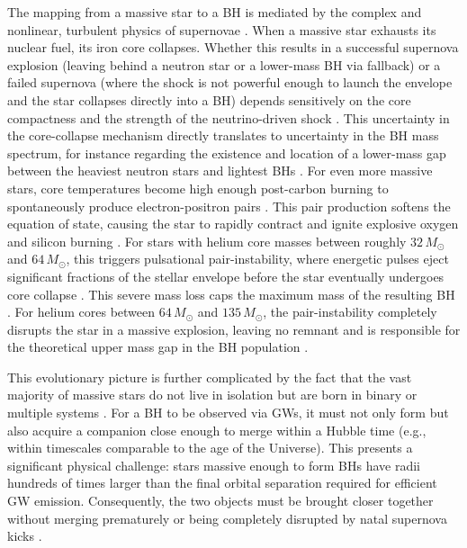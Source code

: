 \begin{refsection}
The mapping from a massive star to a \ac{BH} is mediated by the complex and nonlinear, turbulent physics of supernovae \citep{heger_how_2003}. When a massive star exhausts its nuclear fuel, its iron core collapses. Whether this results in a successful supernova explosion (leaving behind a neutron star or a lower-mass \ac{BH} via fallback) or a failed supernova (where the shock is not powerful enough to launch the envelope and the star collapses directly into a \ac{BH}) depends sensitively on the core compactness and the strength of the neutrino-driven shock \citep[e.g.,][]{sukhbold_core-collapse_2016, burrows_overarching_2020}. This uncertainty in the core-collapse mechanism directly translates to uncertainty in the \ac{BH} mass spectrum, for instance regarding the existence and location of a lower-mass gap between the heaviest neutron stars and lightest \acp{BH} \citep{fryer_compact_2012, abac_observation_2024}. For even more massive stars, core temperatures become high enough post-carbon burning to spontaneously produce electron-positron pairs \citep{fowler_neutrino_1964, Barkat:1967zz}. This pair production softens the equation of state, causing the star to rapidly contract and ignite explosive oxygen and silicon burning \citep{farmer_mind_2019}. For stars with helium core masses between roughly $32\,M_{\odot}$ and $64\,M_{\odot}$, this triggers pulsational pair-instability, where energetic pulses eject significant fractions of the stellar envelope before the star eventually undergoes core collapse \citep{belczynski_effect_2016, stevenson_impact_2019}. This severe mass loss caps the maximum mass of the resulting \ac{BH} \citep{woosley_pair-instability_2021}. For helium cores between $64\,M_{\odot}$ and $135\,M_{\odot}$, the pair-instability completely disrupts the star in a massive explosion, leaving no remnant and is responsible for the theoretical upper mass gap in the \ac{BH} population \citep{woosley_pulsational_2007, Woosley:2016hmi}.

This evolutionary picture is further complicated by the fact that the vast majority of massive stars do not live in isolation but are born in binary or multiple systems \citep[e.g.][]{sana_binary_2012}. For a \ac{BH} to be observed via \acp{GW}, it must not only form but also acquire a companion close enough to merge within a Hubble time (e.g., within timescales comparable to the age of the Universe). This presents a significant physical challenge: stars massive enough to form \acp{BH} have radii hundreds of times larger than the final orbital separation required for efficient \ac{GW} emission. Consequently, the two objects must be brought closer together without merging prematurely or being completely disrupted by natal supernova kicks \citep{Mandel:2018hfr}.


\end{refsection}
